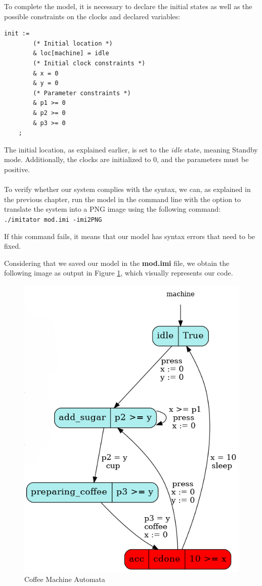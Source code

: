 To complete the model, it is necessary to declare the initial states as well as the possible constraints on the clocks and declared variables:

\begin{lstlisting}[language=UPPAAL]
    init :=
    	(* Initial location *)
    	& loc[machine] = idle
    	(* Initial clock constraints *)
    	& x = 0
    	& y = 0
    	(* Parameter constraints *)
    	& p1 >= 0
    	& p2 >= 0
    	& p3 >= 0
    ;
\end{lstlisting}



The initial location, as explained earlier, is set to the \textit{idle} state, meaning Standby mode. Additionally, the clocks are initialized to 0, and the parameters must be positive.

\paragraph{}

To verify whether our system complies with the syntax, we can, as explained in the previous chapter, run the model in the command line with the option to translate the system into a PNG image using the following command: \texttt{./imitator mod.imi -imi2PNG}

If this command fails, it means that our model has syntax errors that need to be fixed.

Considering that we saved our model in the \textbf{mod.imi} file, we obtain the following image as output in Figure \ref{fig:cof_output}, which visually represents our code.




\begin{figure} [H]
    \centering
    \includegraphics[width=0.55\linewidth]{images/sys.png}
    \caption[Coffee Machine Automata]{Coffee Machine Automata}
    \label{fig:cof_output}
\end{figure}




